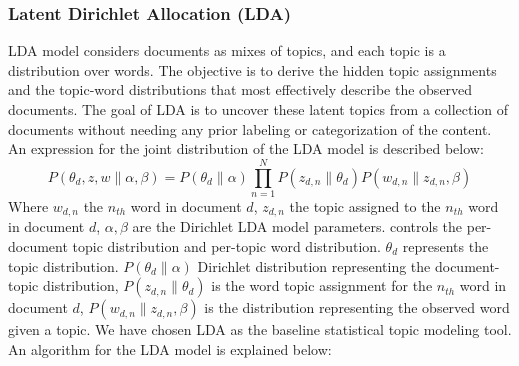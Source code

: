 \documentclass[sn-mathphys,Numbered]{sn-jnl}%
\theoremstyle{thmstyleone}%
\theoremstyle{thmstyletwo}%
\theoremstyle{thmstylethree}%
\begin{document}
\subsubsection{Latent Dirichlet Allocation (LDA)} \label{lda_model} 
LDA model \cite{jelodar_latent_2019, gupta_pan_lda_2021, pichardo_lagunas_svd_lda_2015, selvi_classification_2019} considers documents as mixes of topics, and each topic is a distribution over words. The objective is to derive the hidden topic assignments and the topic-word distributions that most effectively describe the observed documents. The goal of LDA is to uncover these latent topics from a collection of documents without needing any prior labeling or categorization of the content. An expression for the joint distribution of the LDA model is described below: \begin{equation} P(\theta_d,z,w\|\alpha,\beta)=P(\theta_d\|\alpha)\prod^N_{n=1}P(z_{d,n}\|\theta_d)P(w_{d,n}\|z_{d,n},\beta) \end{equation} Where $w_{d,n}$ the $n_{th}$ word in document $d$, $z_{d,n}$ the topic assigned to the $n_{th}$ word in document $d$, $\alpha,\beta$ are the Dirichlet LDA model parameters. controls the per-document topic distribution and per-topic word distribution. $\theta_d$ represents the topic distribution. $P(\theta_d \| \alpha)$ Dirichlet distribution representing the document-topic distribution, $P(z_{d,n}\|\theta_d)$ is the word topic assignment for the $n_{th}$ word in document $d$, $P(w_{d,n}\|z_{d,n},\beta)$ is the distribution representing the observed word given a topic. We have chosen LDA as the baseline statistical topic modeling tool. \\

An algorithm for the LDA model is explained below:
\end{document}
